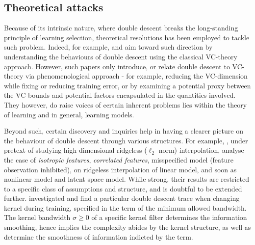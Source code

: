 \documentclass[
  journal=largetwo,
  year=2025,
  volume=37,
]{cup-journal}
\begin{document}
\subsection{Theoretical attacks}

Because of its intrinsic nature, where double descent breaks the long-standing principle of learning selection, theoretical resolutions has been employed to tackle such problem. Indeed, for example, \cite{cherkassky2024understand} and \cite{lee2022vctheoreticalexplanationdouble} aim toward such direction by understanding the behaviours of double descent using the classical VC-theory approach. However, such papers only introduce, or relate double descent to VC-theory via phenomenological approach - for example, reducing the VC-dimension while fixing or reducing training error, or by examining a potential proxy between the VC-bounds and potential factors encapsulated in the quantities involved. They however, do raise voices of certain inherent problems lies within the theory of learning and in general, learning models. 

Beyond such, certain discovery and inquiries help in having a clearer picture on the behaviour of double descent through various structures. For example, \cite{hastie2019surprises}, under pretext of studying high-dimensional ridgeless ($\ell_{2}$ norm) interpolation, analyse the case of \textit{isotropic features}, \textit{correlated features}, misspecified model (feature observation inhibited), on ridgeless interpolation of linear model, and soon as nonlinear model and latent space model. While strong, their results are restricted to a specific class of assumptions and structure, and is doubtful to be extended further. \cite{allerbo2025changingkerneltrainingleads} investigated and find a particular double descent trace when changing kernel during training, specified in the term of the minimum allowed bandwidth. The kernel bandwidth $\sigma\geq 0$ of a specific kernel filter determines the information smoothing, hence implies the complexity abides by the kernel structure, as well as determine the smoothness of information indicted by the term. 
\end{document}
